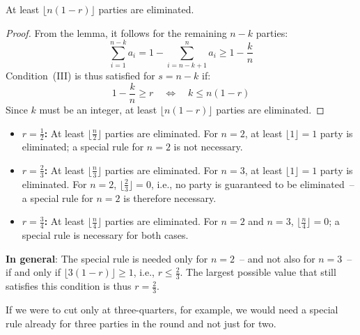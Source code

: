 \begin{maintheorem}
At least $\lfloor n(1-r) \rfloor$ parties are eliminated.
\end{maintheorem}

\begin{proof}
From the lemma, it follows for the remaining $n-k$ parties:
\begin{equation}
  \sum_{i=1}^{n-k} a_i = 1 - \sum_{i=n-k+1}^{n} a_i \geq 1 - \frac{k}{n}
\end{equation}
Condition~(III) is thus satisfied for $s = n-k$ if:
\begin{equation}
  1 - \frac{k}{n} \geq r \quad \Longleftrightarrow \quad k \leq n(1-r)
\end{equation}
Since $k$ must be an integer, at least $\lfloor n(1-r) \rfloor$ parties are eliminated.
\end{proof}


\begin{itemize}
  \item \textbf{$r = \frac{1}{2}$:} At least $\lfloor \frac{n}{2} \rfloor$
    parties are eliminated. For $n = 2$, at least $\lfloor 1 \rfloor = 1$ party is eliminated; a
    special rule for $n = 2$ is not necessary.

  \item \textbf{$r = \frac{2}{3}$:} At least $\lfloor \frac{n}{3} \rfloor$
    parties are eliminated. For $n = 3$, at least $\lfloor 1 \rfloor = 1$ party is eliminated.
    For $n = 2$, $\lfloor \frac{2}{3} \rfloor = 0$, i.e., no party is
    guaranteed to be eliminated~-- a special rule for $n = 2$ is therefore necessary.

  \item \textbf{$r = \frac{3}{4}$:} At least $\lfloor \frac{n}{4} \rfloor$
    parties are eliminated. For $n = 2$ and $n = 3$, $\lfloor \frac{n}{4} \rfloor = 0$; a
    special rule is necessary for both cases.
\end{itemize}

\textbf{In general}: The special rule is needed only for $n = 2$~-- and
not also for $n = 3$~-- if and only if $\lfloor 3(1-r) \rfloor \geq 1$, i.e., $r \leq \frac{2}{3}$.
The largest possible value that still satisfies this condition is thus $r = \frac{2}{3}$.

If we were to cut only at three-quarters, for example, we would need a special rule
already for three parties in the round and not just for two.

